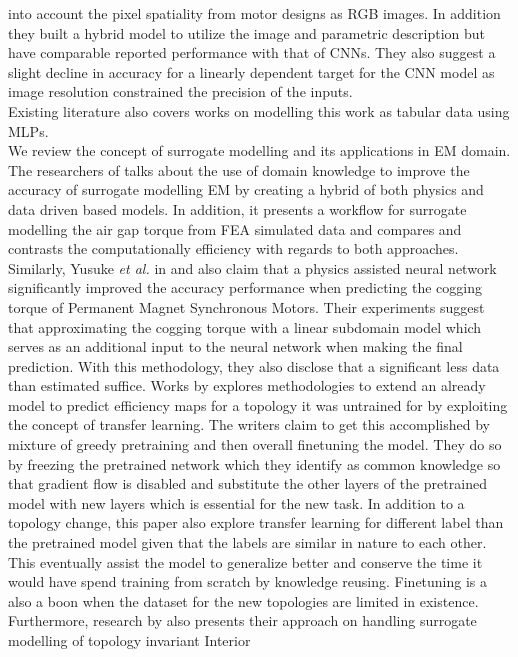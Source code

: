 \documentclass{report} %
\begin{document}
into account the pixel spatiality from motor designs as RGB images. In addition they built a hybrid model to utilize the image and parametric 
description but have comparable reported performance with that of \ac{CNN}s.
They also suggest a slight decline in accuracy for a linearly dependent target for the \ac{CNN} model as image resolution constrained the precision of the inputs.\\
Existing literature also covers works on modelling this work as tabular data using \ac{MLP}s. \\
We review the concept of surrogate modelling and its applications in \ac{EM} domain.
The researchers of \cite{SM EMT-2020} talks about the use of domain knowledge to improve the accuracy of surrogate modelling \ac{EM} by creating a hybrid of both 
physics and data driven based models.
In addition, it presents a workflow for surrogate modelling the air gap torque from \ac{FEA} simulated data and compares and contrasts the computationally efficiency with regards to both approaches. 
Similarly, Yusuke \textit{et al.} in \cite{PANN-MT-2021} and \cite{PANN-MOO-2021} also claim that a physics assisted neural network significantly improved the accuracy performance when predicting the cogging torque 
of Permanent Magnet Synchronous Motors. Their experiments suggest that approximating the cogging torque with a linear subdomain model which serves as an additional 
input to the neural network when making the final prediction. With this methodology, they also disclose that a significant less data than estimated suffice.
Works by \cite{EM TL-2020} explores methodologies to extend an already model to predict efficiency maps for a topology it was untrained for by exploiting 
the concept of transfer learning. The writers claim to get this accomplished by mixture of greedy pretraining and then overall finetuning the model.
They do so by freezing the pretrained network which they identify as common knowledge so that gradient flow is disabled and substitute the other 
layers of the pretrained model with new layers which is essential for the new task.
In addition to a topology change, this paper also explore transfer learning for different label than the pretrained model given that the labels are similar in nature to each other. 
This eventually assist the model to generalize better and conserve the time it would have spend training from scratch by knowledge reusing. 
Finetuning is a also a boon when the dataset for the new topologies are limited in existence.\\
Furthermore, research by \cite{EM CNN-2024} also presents their approach on handling surrogate modelling of topology invariant Interior 
\end{document}
